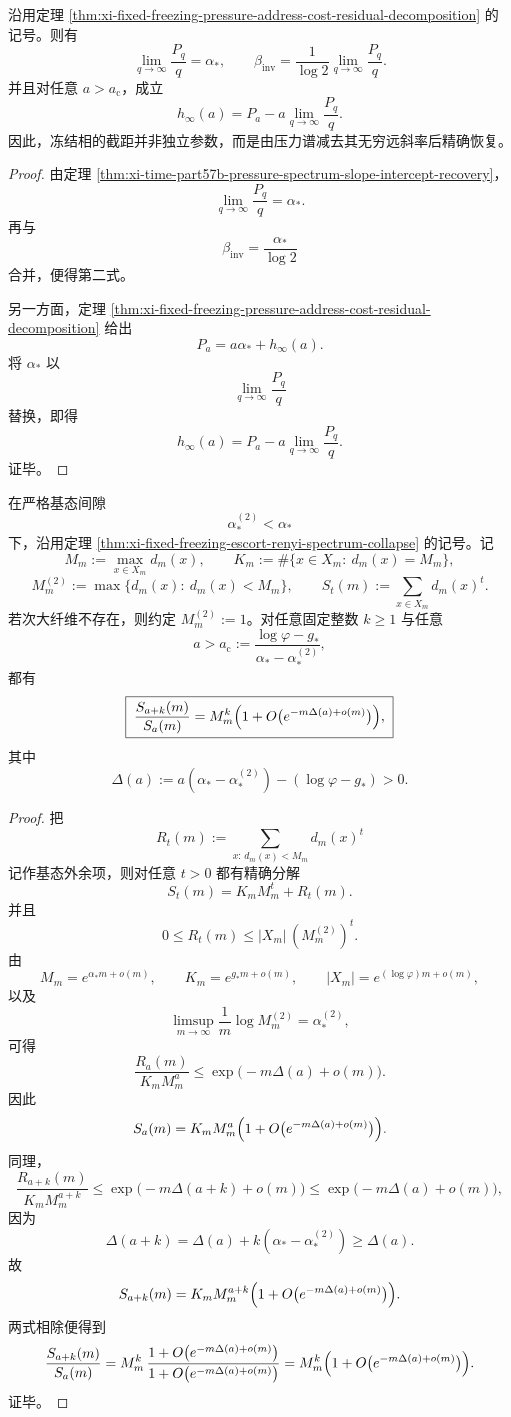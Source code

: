 \begin{corollary}\label{cor:xi-fixed-freezing-slope-intercept-inversion}
沿用定理 \ref{thm:xi-fixed-freezing-pressure-address-cost-residual-decomposition} 的记号。则有
\[
\boxed{\;
\lim_{q\to\infty}\frac{P_q}{q}=\alpha_*,
\qquad
\beta_{\mathrm{inv}}
=
\frac{1}{\log 2}\lim_{q\to\infty}\frac{P_q}{q}.\;}
\]
并且对任意 \(a>a_{\mathrm c}\)，成立
\[
\boxed{\;
h_\infty(a)
=
P_a-a\lim_{q\to\infty}\frac{P_q}{q}.\;}
\]
因此，冻结相的截距并非独立参数，而是由压力谱减去其无穷远斜率后精确恢复。
\end{corollary}
\begin{proof}
由定理 \ref{thm:xi-time-part57b-pressure-spectrum-slope-intercept-recovery}，
\[
\lim_{q\to\infty}\frac{P_q}{q}=\alpha_*.
\]
再与
\[
\beta_{\mathrm{inv}}=\frac{\alpha_*}{\log 2}
\]
合并，便得第二式。

另一方面，定理
\ref{thm:xi-fixed-freezing-pressure-address-cost-residual-decomposition}
给出
\[
P_a=a\alpha_*+h_\infty(a).
\]
将 \(\alpha_*\) 以
\[
\lim_{q\to\infty}\frac{P_q}{q}
\]
替换，即得
\[
h_\infty(a)
=
P_a-a\lim_{q\to\infty}\frac{P_q}{q}.
\]
证毕。
\end{proof}

\begin{theorem}[冻结相中高阶幂和比值的指数锁定]\label{thm:xi-fixed-freezing-power-sum-ratio-locking}
在严格基态间隙
\[
\alpha_*^{(2)}<\alpha_*
\]
下，沿用定理 \ref{thm:xi-fixed-freezing-escort-renyi-spectrum-collapse} 的记号。记
\[
M_m:=\max_{x\in X_m}d_m(x),
\qquad
K_m:=\#\{x\in X_m:\ d_m(x)=M_m\},
\]
\[
M_m^{(2)}:=\max\{d_m(x):\ d_m(x)<M_m\},
\qquad
S_t(m):=\sum_{x\in X_m}d_m(x)^t.
\]
若次大纤维不存在，则约定 \(M_m^{(2)}:=1\)。对任意固定整数 \(k\ge 1\) 与任意
\[
a>a_{\mathrm c}:=\frac{\log\varphi-g_*}{\alpha_*-\alpha_*^{(2)}},
\]
都有
\[
\boxed{\;
\frac{S_{a+k}(m)}{S_a(m)}
=
M_m^k\Bigl(1+O\bigl(e^{-m\Delta(a)+o(m)}\bigr)\Bigr),\;}
\]
其中
\[
\Delta(a):=a(\alpha_*-\alpha_*^{(2)})-(\log\varphi-g_*)>0.
\]
\end{theorem}
\begin{proof}
把
\[
R_t(m):=\sum_{x:\,d_m(x)<M_m}d_m(x)^t
\]
记作基态外余项，则对任意 \(t>0\) 都有精确分解
\[
S_t(m)=K_mM_m^t+R_t(m).
\]
并且
\[
0\le R_t(m)\le |X_m|\,(M_m^{(2)})^t.
\]
由
\[
M_m=e^{\alpha_* m+o(m)},
\qquad
K_m=e^{g_* m+o(m)},
\qquad
|X_m|=e^{(\log\varphi)m+o(m)},
\]
以及
\[
\limsup_{m\to\infty}\frac1m\log M_m^{(2)}=\alpha_*^{(2)},
\]
可得
\[
\frac{R_a(m)}{K_mM_m^a}
\le
\exp\!\bigl(-m\Delta(a)+o(m)\bigr).
\]
因此
\[
S_a(m)=K_mM_m^a\Bigl(1+O\bigl(e^{-m\Delta(a)+o(m)}\bigr)\Bigr).
\]
同理，
\[
\frac{R_{a+k}(m)}{K_mM_m^{a+k}}
\le
\exp\!\bigl(-m\Delta(a+k)+o(m)\bigr)
\le
\exp\!\bigl(-m\Delta(a)+o(m)\bigr),
\]
因为
\[
\Delta(a+k)=\Delta(a)+k(\alpha_*-\alpha_*^{(2)})\ge \Delta(a).
\]
故
\[
S_{a+k}(m)=K_mM_m^{a+k}\Bigl(1+O\bigl(e^{-m\Delta(a)+o(m)}\bigr)\Bigr).
\]
两式相除便得到
\[
\frac{S_{a+k}(m)}{S_a(m)}
=
M_m^k\,
\frac{1+O\bigl(e^{-m\Delta(a)+o(m)}\bigr)}
{1+O\bigl(e^{-m\Delta(a)+o(m)}\bigr)}
=
M_m^k\Bigl(1+O\bigl(e^{-m\Delta(a)+o(m)}\bigr)\Bigr).
\]
证毕。
\end{proof}

